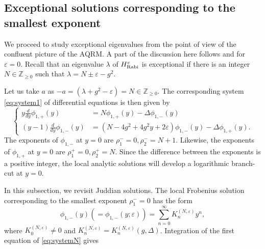 \documentclass[11pt]{article}
\numberwithin{equation}{section}
\newcommand{\Z}{\mathbb{Z}} %
\newcommand{\e}{\varepsilon}
\newcommand{\HRabi}[1]{H_{\text{\upshape Rabi}}^{#1}} %
\theoremstyle{plain}
\theoremstyle{definition}
\theoremstyle{remark}
\begin{document}
\subsection{Exceptional solutions corresponding to the smallest exponent} \label{sec:smallexp}

We proceed to study exceptional eigenvalues from the point of view of the confluent picture of
the AQRM. A part of the discussion here follows \cite{B2013AP} and \cite{B2013MfI} for $\e=0$.
Recall that an eigenvalue \(\lambda\) of \(\HRabi{\e}\) is exceptional if there is an integer
\(N \in \Z_{\geq 0}\) such that $\lambda=N\pm \e -g^2$.

Let us take $a$ as \( -a = (\lambda + g^2 - \e) = N \in \Z_{\geq 0}\).
The corresponding system \eqref{eq:system1} of differential equations is then given by
\begin{equation} \label{eq:systemN}
  \left\{
    \begin{aligned}
    y \frac{d}{d y} \phi_{1,+}(y) &= N \phi_{1,+}(y) - \Delta \phi_{1,-}(y)  \\
    (y-1) \frac{d}{d y} \phi_{1,-}(y) &= ( N  -4 g^2 + 4 g^2 y + 2\e) \phi_{1,-}(y) - \Delta \phi_{1,+}(y).
    \end{aligned} \right.
\end{equation}
The exponents of \(\phi_{1,-}\) at \(y=0\) are \( \rho^-_1 =0, \rho^-_2 = N+1\). Likewise, the exponents of \(\phi_{1,+}\) at
\(y=0\) are \( \rho^+_1 =0, \rho^+_2 = N\). Since the difference between the exponents is a positive integer,
the local analytic solutions will develop a logarithmic branch-cut at \(y=0\).

In this subsection, we revisit Juddian solutions. The local Frobenius solution corresponding to the smallest
exponent \(\rho_1^- = 0\) has the form
\begin{equation}\label{smallerFrobenius}
  \phi_{1,-}(y) (= \phi_{1,-}(y;\e)) =  \sum_{n=0}^\infty K^{(N,\e)}_n y^n,
\end{equation}
where \(K^{(N,\e)}_0 \not= 0 \) and \(K^{(N,\e)}_n = K^{(N,\e)}_n(g,\Delta)\). Integration of the first equation of \eqref{eq:systemN}
gives
\end{document}
